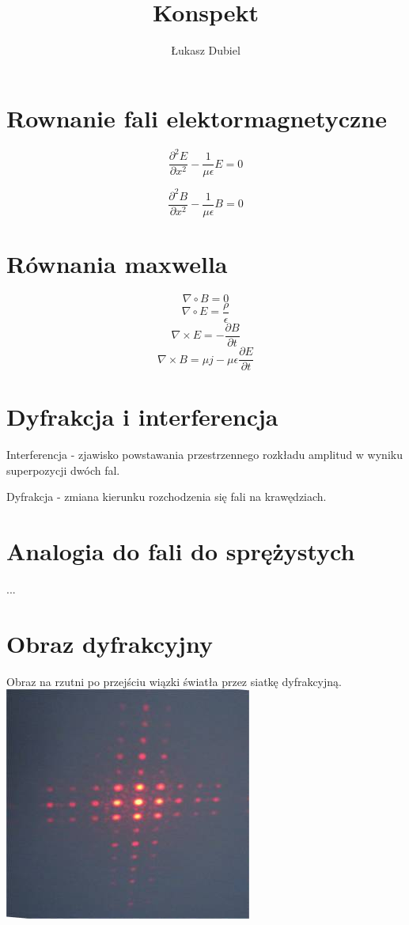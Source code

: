 \documentclass[11pt]{article}
\author{Łukasz Dubiel}
\title{Konspekt}
\begin{document}
\maketitle

\section{Rownanie fali elektormagnetyczne}
$$ \frac{\partial^2 E}{\partial x^2} - \frac{1}{\mu \epsilon} E = 0 $$

$$ \frac{\partial^2 B}{\partial x^2} - \frac{1}{\mu \epsilon} B = 0 $$

\section{Równania maxwella}
$$ \nabla \circ B = 0 $$
$$ \nabla \circ E = \frac{\rho}{\epsilon} $$
$$ \nabla \times E = - \frac{\partial B}{\partial t} $$
$$ \nabla \times B = \mu j - \mu \epsilon \frac{\partial E}{\partial t} $$

\section{Dyfrakcja i interferencja}
Interferencja - zjawisko powstawania przestrzennego rozkładu amplitud w wyniku superpozycji dwóch fal.

Dyfrakcja - zmiana kierunku rozchodzenia się fali na krawędziach.

\section{Analogia do fali do sprężystych}

...

\section{Obraz dyfrakcyjny}
Obraz na rzutni po przejściu wiązki światła przez siatkę dyfrakcyjną.
\includegraphics{image018.jpg}
\end{document}
